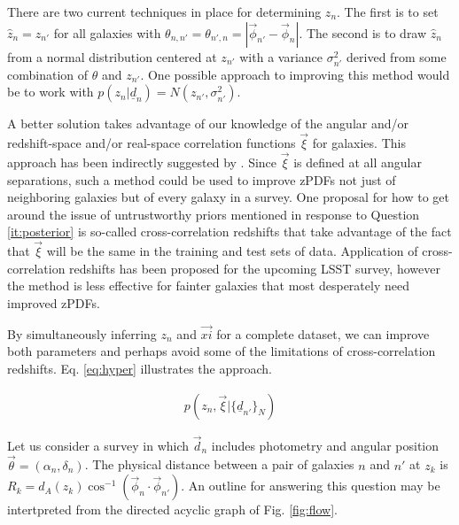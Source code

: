 \documentclass[12pt, onecolumn]{emulateapj}
\newcommand{\textul}{\underline}
\begin{document}
There are two current techniques in place for determining $z_{n}$.  The first is to set $\hat{z}_{n}=z_{n'}$ for all galaxies with $\theta_{n,n'}=\theta_{n',n}=|\vec{\phi}_{n'}-\vec{\phi}_{n}|$.  The second is to draw $\hat{z}_{n}$ from a normal distribution centered at $z_{n'}$ with a variance $\sigma^{2}_{n'}$ derived from some combination of $\theta$ and $z_{n'}$.  One possible approach to improving this method would be to work with $p(z_{n}|\textul{d}_{n})=N(z_{n'},\sigma^{2}_{n'})$.

A better solution takes advantage of our knowledge of the angular and/or redshift-space and/or real-space correlation functions $\vec{\xi}$ for galaxies.  This approach has been indirectly suggested by \citet{sch06}. Since $\vec{\xi}$ is defined at all angular separations, such a method could be used to improve zPDFs not just of neighboring galaxies but of every galaxy in a survey.  One proposal for how to get around the issue of untrustworthy priors mentioned in response to Question \ref{it:posterior} is so-called cross-correlation redshifts that take advantage of the fact that $\vec{\xi}$ will be the same in the training and test sets of data.  \citep{new08}  Application of cross-correlation redshifts has been proposed for the upcoming LSST survey, however the method is less effective for fainter galaxies that most desperately need improved zPDFs.  \citep{abe09}

By simultaneously inferring $z_{n}$ and $\vec{xi}$ for a complete dataset, we can improve both parameters and perhaps avoid some of the limitations of cross-correlation redshifts.  Eq. \ref{eq:hyper} illustrates the approach.

\begin{align}
\label{eq:hyper}
p(z_{n},\vec{\xi}|\{\textul{d}_{n'}\}_{N})
\end{align}

Let us consider a survey in which $\vec{d}_{n}$ includes photometry and angular position $\vec{\theta}=(\alpha_{n},\delta_{n})$.  The physical distance between a pair of galaxies $n$ and $n'$ at $z_{k}$ is $R_{k}=d_{A}(z_{k})\cos^{-1}(\vec{\phi}_{n}\cdot\vec{\phi}_{n'})$.  An outline for answering this question may be intertpreted from the directed acyclic graph of Fig. \ref{fig:flow}.
\end{document}
